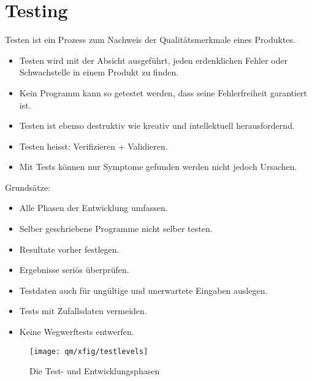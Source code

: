 \chapter{Testing}
%
Testen ist ein Prozess zum Nachweis der Qualitätsmerkmale eines
Produktes.
\begin{itemize}
\item Testen wird mit der Absicht ausgeführt,
jeden erdenklichen Fehler oder Schwachstelle in einem Produkt zu finden.
\item Kein Programm kann so getestet werden, dass seine Fehlerfreiheit
garantiert ist.
\item Testen ist ebenso destruktiv wie
  kreativ und intellektuell herausfordernd.
\item Testen heisst: Verifizieren + Validieren.
\item Mit Tests können nur Symptome gefunden werden nicht jedoch Ursachen.
\end{itemize}
\ifslides
\newpage
\fi
Grunds\"atze:
\begin{itemize}
\item Alle Phasen der Entwicklung umfassen.
\item Selber geschriebene Programme nicht selber testen.
\item Resultate vorher festlegen.
\item Ergebnisse seri\"os \"uberpr\"ufen.
\item Testdaten auch f\"ur ung\"ultige und unerwartete Eingaben auslegen.
\item Tests mit Zufallsdaten vermeiden. %
\item Keine Wegwerftests entwerfen.
\end{itemize}
\newslide
\begin{figure}[H]
\begin{center}
\texttt{[image: qm/xfig/testlevels]}
\caption{Die Test- und Entwicklungsphasen}
\end{center}
\end{figure}
\newslide
